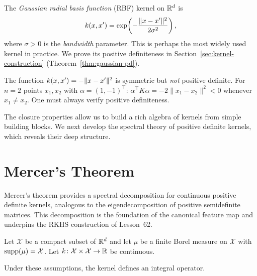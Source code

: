 \documentclass[11pt,a4paper]{article}
\begin{document}
\begin{example}
\label{ex:gaussian-rbf}
The \emph{Gaussian radial basis function} (RBF) kernel on $\mathbb{R}^d$ is
\begin{equation}
\label{eq:gaussian-kernel}
k(x, x') = \exp\!\left(-\frac{\|x - x'\|^2}{2\sigma^2}\right),
\end{equation}
where $\sigma > 0$ is the \emph{bandwidth} parameter. This is
perhaps the most widely used kernel in practice. We prove its
positive definiteness in Section~\ref{sec:kernel-construction}
(Theorem~\ref{thm:gaussian-pd}).
\end{example}

\begin{warning}[title={Not Every Symmetric Function is a Kernel}]
The function $k(x, x') = -\|x - x'\|^2$ is symmetric but
\emph{not} positive definite. For $n = 2$ points $x_1, x_2$ with
$\alpha = (1, -1)^\top$: $\alpha^\top K \alpha = -2\|x_1 - x_2\|^2
< 0$ whenever $x_1 \ne x_2$. One must always verify positive
definiteness.
\end{warning}

The closure properties allow us to build a rich algebra of kernels
from simple building blocks. We next develop the spectral theory of
positive definite kernels, which reveals their deep structure.


\section{Mercer's Theorem}
\label{sec:mercer}

Mercer's theorem provides a spectral decomposition for continuous
positive definite kernels, analogous to the eigendecomposition of
positive semidefinite matrices. This decomposition is the foundation
of the canonical feature map and underpins the RKHS construction
of Lesson~62.

\begin{assumption}
\label{asm:mercer-setting}
Let $\mathcal{X}$ be a compact subset of $\mathbb{R}^d$ and let $\mu$ be
a finite Borel measure on $\mathcal{X}$ with $\operatorname{supp}(\mu) =
\mathcal{X}$. Let $k \colon \mathcal{X} \times \mathcal{X}
\to \mathbb{R}$ be continuous.
\end{assumption}

Under these assumptions, the kernel defines an integral operator.
\end{document}
